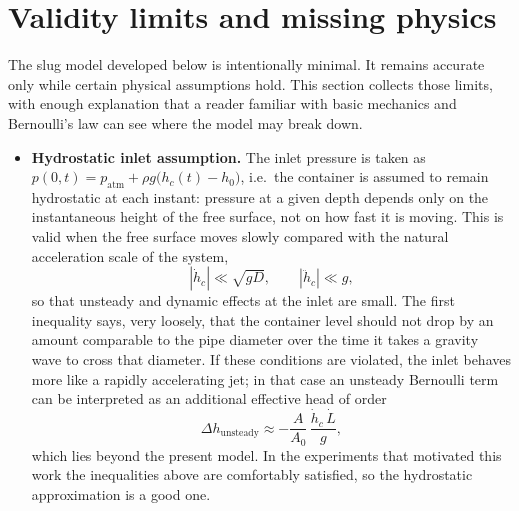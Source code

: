 \documentclass[11pt]{article}
\begin{document}
\section{Validity limits and missing physics}
\label{sec:limits}
The slug model developed below is intentionally minimal. It remains accurate only while
certain physical assumptions hold. This section collects those limits, with enough
explanation that a reader familiar with basic mechanics and Bernoulli's law can see where
the model may break down.
\begin{itemize}
  \item \textbf{Hydrostatic inlet assumption.} The inlet pressure is taken as
    $p(0,t)=p_{\mathrm{atm}}+\rho g\bigl(h_c(t)-h_0\bigr)$, i.e.\ the container is assumed to
    remain hydrostatic at each instant: pressure at a given depth depends only on the
    instantaneous height of the free surface, not on how fast it is moving. This is valid
    when the free surface moves slowly compared with the natural acceleration scale of the
    system,
    \[
      |\dot h_c|\ll \sqrt{gD},\qquad |\ddot h_c|\ll g,
    \]
    so that unsteady and dynamic effects at the inlet are small. The first inequality says,
    very loosely, that the container level should not drop by an amount comparable to the
    pipe diameter over the time it takes a gravity wave to cross that diameter. If these
    conditions are violated, the inlet behaves more like a rapidly accelerating jet; in that
    case an unsteady Bernoulli term can be interpreted as an additional effective head of
    order
    \[
      \Delta h_{\text{unsteady}}\approx -\frac{A}{A_0}\,\frac{\dot h_c\,\dot L}{g},
    \]
    which lies beyond the present model. In the experiments that motivated this work the
    inequalities above are comfortably satisfied, so the hydrostatic approximation is a
    good one.


\end{itemize}
\end{document}
